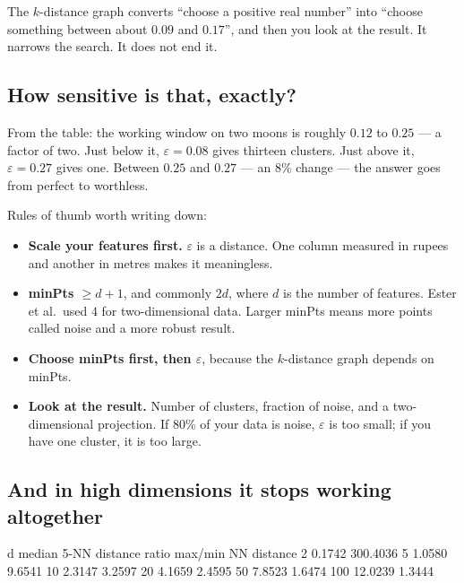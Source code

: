 \documentclass[11pt]{article}
\begin{document}
\begin{keyidea}
The $k$-distance graph converts ``choose a positive real number'' into
``choose something between about $0.09$ and $0.17$'', and then you look at
the result. It narrows the search. It does not end it.
\end{keyidea}

\subsection{How sensitive is that, exactly?}

From the table: the working window on two moons is roughly $0.12$ to $0.25$
--- a factor of two. Just below it, $\varepsilon = 0.08$ gives thirteen
clusters. Just above it, $\varepsilon = 0.27$ gives one. Between $0.25$ and
$0.27$ --- an $8\%$ change --- the answer goes from perfect to worthless.

Rules of thumb worth writing down:

\begin{itemize}[leftmargin=*]
  \item \textbf{Scale your features first.} $\varepsilon$ is a distance. One
    column measured in rupees and another in metres makes it meaningless.
  \item \textbf{minPts $\ge d + 1$}, and commonly $2d$, where $d$ is the
    number of features. Ester et al.\ used $4$ for two-dimensional data.
    Larger minPts means more points called noise and a more robust result.
  \item \textbf{Choose minPts first, then $\varepsilon$}, because the
    $k$-distance graph depends on minPts.
  \item \textbf{Look at the result.} Number of clusters, fraction of noise,
    and a two-dimensional projection. If $80\%$ of your data is noise,
    $\varepsilon$ is too small; if you have one cluster, it is too large.
\end{itemize}

\subsection{And in high dimensions it stops working altogether}

\begin{codeout}
  d      median 5-NN distance   ratio max/min NN distance
    2            0.1742              300.4036
    5            1.0580                9.6541
   10            2.3147                3.2597
   20            4.1659                2.4595
   50            7.8523                1.6474
  100           12.0239                1.3444
\end{codeout}
\end{document}
